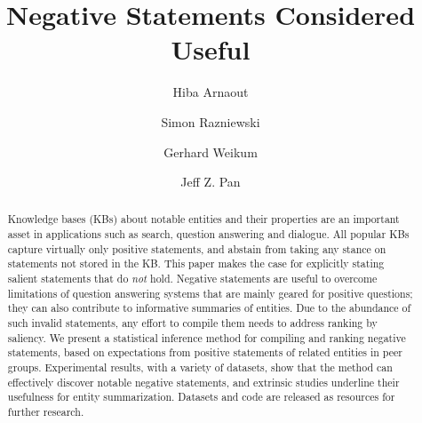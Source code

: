 \documentclass[5p]{elsarticle}
\newcommand{\newtext}[1]{\textcolor{blue}{#1}}
\begin{document}
\newcommand{\sr}[1]{{\textcolor{red}{SR: #1}}}
\newcommand{\GW}[1]{{\color{purple}{GW: #1}}}

\title{Negative Statements Considered Useful}

\author[add1]{Hiba Arnaout}
\author[add1]{Simon Razniewski}
\author[add1]{Gerhard Weikum}
 \author[add2]{Jeff Z. Pan}

\address[add1]{Max Planck Institute for Informatics, Saarland Informatics Campus, Saarbr{\"u}cken 66123, Germany}
\address[add2]{School of Informatics, The University of Edinburgh, Informatics Forum, Edinburgh EH8 9AB, Scotland}


\begin{abstract}


%
Knowledge bases (KBs)
about notable entities and their properties
are an important asset in applications such as search, question answering and dialogue. 
All popular KBs capture virtually only positive statements, 
and abstain from taking any stance on statements not 
stored in the KB.
%  
This paper makes the case for explicitly stating salient statements 
that
do \textit{not} hold.
Negative statements are useful to overcome
 limitations of question answering systems that are mainly geared for positive questions;
 they  can also contribute to informative summaries of entities.
 Due to the abundance of such invalid statements, any effort to compile them needs to address ranking by saliency. We present a statistical inference method for 
 compiling and ranking negative statements, based on expectations from positive statements of related  entities
 in peer groups. %
 Experimental results, with a variety of datasets,
 show that 
 the method can effectively
 discover notable negative statements,
 and extrinsic studies underline their usefulness for
 entity summarization.
 Datasets and code 
 are released as resources for further research.


\end{abstract}
\end{document}
